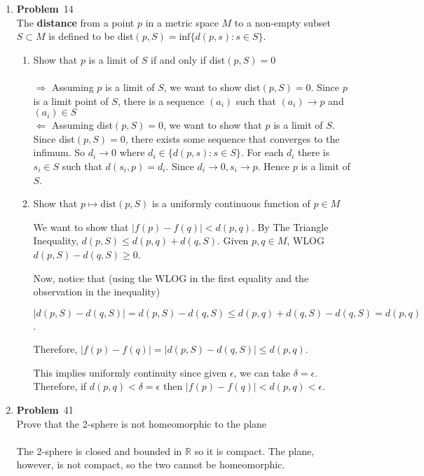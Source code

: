 \documentclass[12pt]{amsart}
\newcommand{\benu}{\begin{enumerate}}
\newcommand{\eenu}{\end{enumerate}}
\theoremstyle{definition}
\newcommand{\mbR}{\mathbb{R}}
\newcommand{\ep}{\epsilon}
\newcommand{\itep}{\item {\bfseries Problem}\ }
\begin{document}
\begin{enumerate}[series=p]
\itep 14\\
The \textbf{distance} from a point $p$ in a metric space $M$ to a non-empty subset $S \subset M$ is defined to be dist$(p, S) = \text{inf}\{d(p,s): s \in S\}$.
\benu
\item Show that $p$ is a limit of $S$ if and only if dist$(p, S) = 0$\\ %
\\
$\Rightarrow$  Assuming $p$ is a limit of $S$, we want to show dist$(p,S) = 0$.  Since $p$ is a limit point of $S$, there is a sequence $(a_i)$ such that $(a_i) \to p$ and $(a_i) \in S$
\\
$\Leftarrow$  Assuming dist$(p,S) = 0$, we want to show that $p$ is a limit of $S$.  Since dist$(p, S) = 0$, there exists some sequence that converges to the infimum.  So $d_i \to 0$ where $d_i \in \{d(p, s): s \in S\}$.  For each $d_i$ there is $s_i \in S$ such that $d(s_i, p) = d_i$.  Since $d_i \to 0, s_i \to p$.  
Hence $p$ is a limit of $S$.
\\
\item Show that $p \mapsto \text{dist}(p, S)$ is a uniformly continuous function of $p \in M$ %
\\
\begin{comment}

We want to show that $\forall \ep > 0 \, \exists \, \delta > 0 \, \forall x,y \in M$ such that $d(x,y) < \delta \implies |\text{dist}(x,s) - \text{dist}(y,s) < \ep|$\\
\end{comment}
We want to show that $|f(p)-f(q)|<d(p,q)$.  By The Triangle Inequality, $d(p,S) \leq d(p,q)+d(q,S)$.  Given $p,q \in M$, WLOG $d(p,S) - d(q,S) \geq 0$.


Now, notice that (using the WLOG in the first equality and the observation in the inequality)


$|d(p,S)-d(q,S)|=d(p,S)-d(q,S) \leq d(p,q)+d(q,S)-d(q,S)=d(p,q)$.


Therefore, $|f(p)-f(q)|=|d(p,S)-d(q,S)| \leq d(p,q)$.


This implies uniformly continuity since given $\epsilon$, we can take $\delta = \epsilon$. Therefore, if $d(p,q)<\delta = \epsilon$ then $|f(p)-f(q)|<d(p,q)<\epsilon$.

\eenu
\newpage

\itep 41\\
Prove that the 2-sphere is not homeomorphic to the plane\\
\\
The 2-sphere is closed and bounded in $\mbR$ so it is compact.  The plane, however, is not compact, so the two cannot be homeomorphic.


\end{enumerate}
\end{document}
